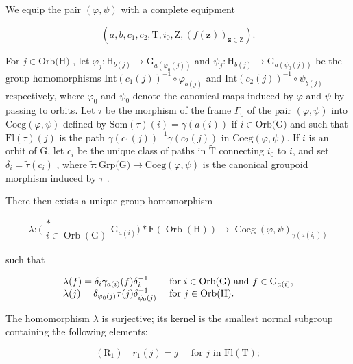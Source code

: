 We equip the pair \((\varphi, \psi)\) with a complete equipment

\[
(a, b, c _ {1}, c _ {2}, \mathrm{T}, i _ {0}, \mathrm{Z}, (f (\mathbf {z})) _ {\mathbf {z} \in \mathrm{Z}}).
\]

For \(j \in \text{Orb(H)}\) , let \(\varphi_j \colon \text{H}_{b(j)} \to \text{G}_{a(\varphi_0(j))}\) and \(\psi_j \colon \text{H}_{b(j)} \to \text{G}_{a(\psi_0(j))}\) be the group homomorphisms \(\text{Int}(c_1(j))^{-1} \circ \varphi_{b(j)}\) and \(\text{Int}(c_2(j))^{-1} \circ \psi_{b(j)}\) respectively, where \(\varphi_0\) and \(\psi_0\) denote the canonical maps induced by \(\varphi\) and \(\psi\) by passing to orbits. Let \(\tau\) be the morphism of the frame \(\Gamma_0\) of the pair \((\varphi, \psi)\) into \(\text{Coeg}(\varphi, \psi)\) defined by \(\text{Som}(\tau)(i) = \gamma(a(i))\) if \(i \in \text{Orb(G)}\) and such that \(\text{Fl}(\tau)(j)\) is the path \(\gamma(c_1(j))^{-1} \gamma(c_2(j))\) in \(\text{Coeg}(\varphi, \psi)\). If \(i\) is an orbit of G, let \(c_i\) be the unique class of paths in \(\widetilde{\text{T}}\) connecting \(i_0\) to \(i\), and set \(\delta_i = \widetilde{\tau}(c_i)\) , where \(\widetilde{\tau} \colon \text{Grp(G)} \to \text{Coeg}(\varphi, \psi)\) is the canonical groupoid morphism induced by \(\tau\) .

There then exists a unique group homomorphism

\[
\lambda \colon \bigl ( \begin{array}{c} * \\ i \in \operatorname{Orb} (\mathrm{G}) \end{array} \mathrm{G} _ {a (i)} \bigr) * \mathrm{F} (\operatorname{Orb} (\mathrm{H})) \to \operatorname{Coeg} (\varphi , \psi) _ {\gamma (a (i _ {0}))}
\]

such that

\[
\begin{array}{l l} \lambda (f) = \delta_ {i} \gamma_ {a (i)} (f) \delta_ {i} ^ {- 1} & \text { for } i \in \mathrm{Orb(G)} \text { and } f \in \mathrm{G} _ {a (i)}, \\ \lambda (j) = \delta_ {\varphi_ {0} (j)} \tau (j) \delta_ {\psi_ {0} (j)} ^ {- 1} & \text { for } j \in \mathrm{Orb(H)}. \end{array}
\]

The homomorphism \(\lambda\) is surjective; its kernel is the smallest normal subgroup containing the following elements:

\[
\left(\mathrm{R} _ {1}\right) \quad r _ {1} (j) = j \quad \text { for } j \text { in } \mathrm{Fl} (\mathrm{T});
\]

